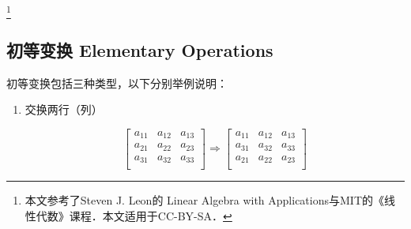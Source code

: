 
\begin{issues}
\issueMissDepend
\end{issues}

\footnote{本文参考了Steven J. Leon的 Linear Algebra with Applications与MIT的《线性代数》课程．本文适用于CC-BY-SA．}

\subsection{初等变换 Elementary Operations}
初等变换包括三种类型，以下分别举例说明：

\begin{enumerate}
\item 交换两行（列）

\begin{equation}
\left[
    \begin{array}{ccc}
        a_{11} & a_{12} & a_{13}\\
        a_{21} & a_{22} & a_{23}\\
        a_{31} & a_{32} & a_{33}\\
    \end{array}
\right]
\Rightarrow
\left[
    \begin{array}{ccc}
        a_{11} & a_{12} & a_{13}\\
        a_{31} & a_{32} & a_{33}\\
        a_{21} & a_{22} & a_{23}\\
    \end{array}
\right]
\end{equation}


\end{enumerate}
